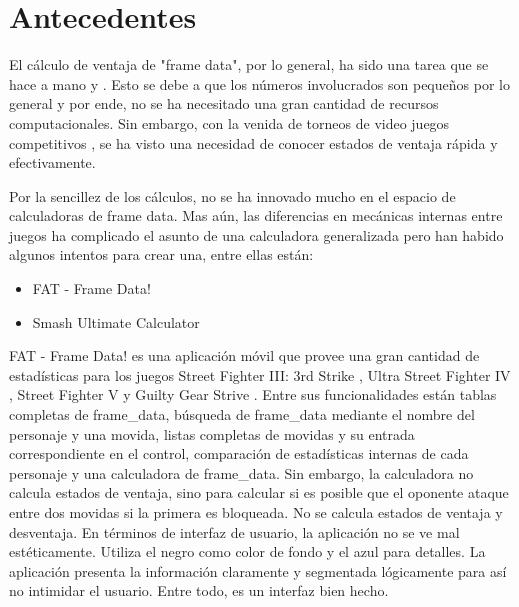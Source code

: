 \section{Antecedentes}

El cálculo de ventaja de "frame data", por lo general, ha sido una tarea que se hace a mano \cite{noauthor_guide_nodate} y \cite{dustloop_using_nodate}. Esto se debe a que los números involucrados son pequeños por lo general y por ende, no se ha necesitado una gran cantidad de recursos computacionales. Sin embargo, con la venida de  torneos de video juegos competitivos \cite{willingham_what_2018}, se ha visto una necesidad de conocer estados de ventaja rápida y efectivamente. 

Por la sencillez de los cálculos, no se ha innovado mucho en el espacio de calculadoras de frame data. Mas aún, las diferencias en mecánicas internas entre juegos ha complicado el asunto de una calculadora generalizada pero han habido algunos intentos para crear una, entre ellas están:
\begin{itemize}
    \item FAT - Frame Data! \cite{d4rkonion_fat_2022}
    \item Smash Ultimate Calculator \cite{noauthor_rubendalssbu-calculator_nodate}
\end{itemize}

FAT - Frame Data! es una aplicación móvil que provee una gran cantidad de estadísticas para los juegos Street Fighter III: 3rd Strike \cite{noauthor_street_2022}, Ultra Street Fighter IV \cite{noauthor_street_2022-1}, Street Fighter V \cite{noauthor_street_2022-2} y Guilty Gear Strive \cite{noauthor_guilty_2022}. Entre sus funcionalidades están tablas completas de \gls{frame_data}, búsqueda de \gls{frame_data} mediante el nombre del personaje y una movida, listas completas de movidas y su entrada correspondiente en el control, comparación de estadísticas internas de cada personaje y una calculadora de \gls{frame_data}. Sin embargo, la calculadora no calcula estados de ventaja, sino para calcular si es posible que el oponente ataque entre dos movidas si la primera es bloqueada. No se calcula estados de ventaja y desventaja. En términos de interfaz de usuario, la aplicación no se ve mal estéticamente. Utiliza el negro como color de fondo y el azul para detalles. La aplicación presenta la información claramente y segmentada lógicamente para así no intimidar el usuario. Entre todo, es un interfaz bien hecho.

